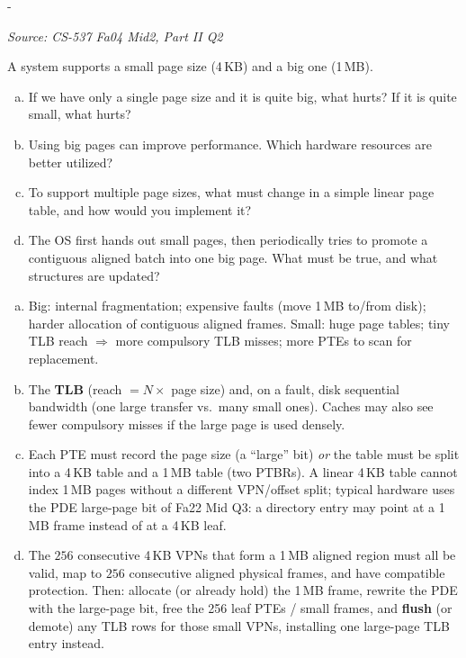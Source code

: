 \documentclass[11pt,a4paper]{article}
\makeatletter
\newcommand{\keepspace}[1]{\par\penalty-100\begingroup
  \setlength{\dimen@}{#1}\dimen@ii\pagegoal\advance\dimen@ii-\pagetotal
  \ifdim\dimen@>\dimen@ii\ifdim\dimen@ii>\z@\vfil\fi\break\fi\endgroup}
\newcounter{qn}[section]
\newenvironment{Qn}[4]{%
  \refstepcounter{qn}\keepspace{7\baselineskip}%
  \begin{tcolorbox}[qboxstyle, title={Q\thesection.\theqn\ \ [#1 \textbar\ #2]\ \ #4}]%
  {\footnotesize\color{g3}\textit{Source: #3}}\par\smallskip%
}{%
  \end{tcolorbox}%
}
\newenvironment{Sol}{%
  \begin{tcolorbox}[sboxstyle, title={Solution}]%
}{%
  \end{tcolorbox}\vspace{0.35em}%
}
\makeatother
\begin{document}
\begin{Qn}{Medium}{Lect 13--14}{CS-537 Fa04 Mid2, Part II Q2}{Two page sizes: costs, TLB reach, and PT changes}
A system supports a small page size (4\,KB) and a big one (1\,MB).
\begin{enumerate}[(a)]
\item If we have only a single page size and it is quite big, what
      hurts? If it is quite small, what hurts?
\item Using big pages can improve performance. Which hardware resources
      are better utilized?
\item To support multiple page sizes, what must change in a simple
      linear page table, and how would you implement it?
\item The OS first hands out small pages, then periodically tries to
      promote a contiguous aligned batch into one big page. What must
      be true, and what structures are updated?
\end{enumerate}
\end{Qn}
\begin{Sol}
\begin{enumerate}[(a)]
\item Big: internal fragmentation; expensive faults (move 1\,MB
      to/from disk); harder allocation of contiguous aligned frames.
      Small: huge page tables; tiny TLB reach $\Rightarrow$ more
      compulsory TLB misses; more PTEs to scan for replacement.
\item The \textbf{TLB} (reach $= N\times$ page size) and, on a fault,
      disk sequential bandwidth (one large transfer vs.\ many small
      ones). Caches may also see fewer compulsory misses if the
      large page is used densely.
\item Each PTE must record the page size (a ``large'' bit) \emph{or}
      the table must be split into a 4\,KB table and a 1\,MB table
      (two PTBRs). A linear 4\,KB table cannot index 1\,MB pages
      without a different VPN/offset split; typical hardware uses
      the PDE large-page bit of Fa22 Mid Q3: a directory entry may
      point at a 1\,MB frame instead of at a 4\,KB leaf.
\item The $256$ consecutive 4\,KB VPNs that form a 1\,MB aligned
      region must all be valid, map to $256$ consecutive aligned
      physical frames, and have compatible protection. Then: allocate
      (or already hold) the 1\,MB frame, rewrite the PDE with the
      large-page bit, free the 256 leaf PTEs / small frames, and
      \textbf{flush} (or demote) any TLB rows for those small VPNs,
      installing one large-page TLB entry instead.
\end{enumerate}
\end{Sol}
\end{document}
